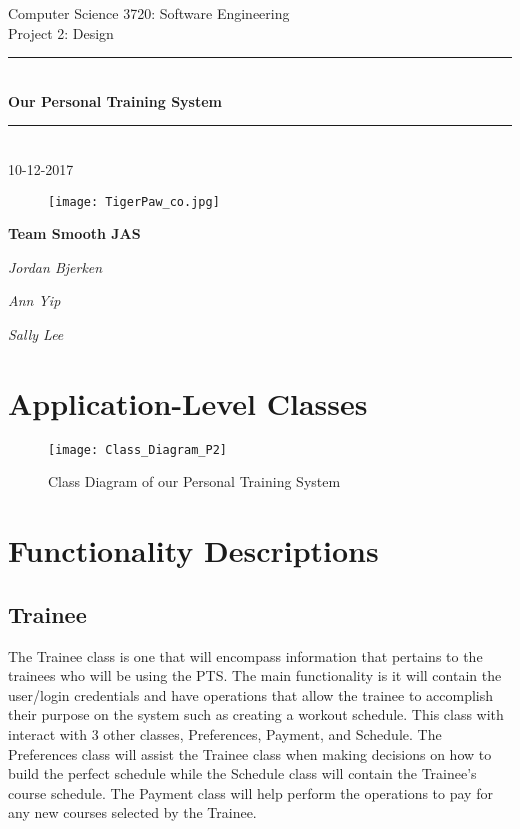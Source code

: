 \documentclass[12pt]{article}
\begin{document}
\begin{titlepage}
\newcommand{\HRule}{\rule{\linewidth}{0.5mm}} 

\center
\large Computer Science 3720: Software Engineering \\[0.2cm]

\normalsize Project 2:  Design \\[2cm]


\HRule \\[0.2cm]

\huge \textbf{Our Personal Training System}

\HRule \\[0.5cm]

\normalsize 10-12-2017
\vspace{5cm}


\begin{figure}[h]
\begin{center}
\texttt{[image: TigerPaw\_co.jpg]}
\end{center}
\end{figure}


\large \textbf{Team Smooth JAS}

\emph{Jordan Bjerken}

\emph{Ann Yip}

\emph{Sally Lee}

\end{titlepage}

\section{Application-Level Classes}
\begin{figure}[h]
\begin{center}
\texttt{[image: Class\_Diagram\_P2]}
\caption{Class Diagram of our Personal Training System}
\end{center}
\end{figure}
\section{Functionality Descriptions}
\subsection{Trainee}
The Trainee class is one that will encompass information that pertains to the trainees who will be using the PTS. The main functionality is it will contain the user/login credentials and have operations that allow the trainee to accomplish their purpose on the system such as creating a workout schedule. This class with interact with 3 other classes, Preferences, Payment, and Schedule. The Preferences class will assist the Trainee class when making decisions on how to build the perfect schedule while the Schedule class will contain the Trainee’s course schedule. The Payment class will help perform the operations to pay for any new courses selected by the Trainee.
\end{document}
